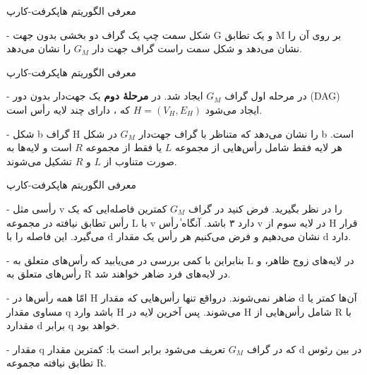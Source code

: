 \begin{itemframe}{‌معرفی الگوریتم هاپکرفت-کارپ}
\item[-]
شکل سمت چپ یک گراف دو بخشی بدون جهت G و یک تطابق M بر روی آن را نشان می‌دهد و شکل سمت راست گراف جهت دار $G_M$ را نشان می‌دهد.
\begin{figure}[h]
  \centering
  \begin{minipage}{0.45\textwidth}
  \end{minipage}
  \hfill
  \begin{minipage}{0.45\textwidth}
  \end{minipage}
\end{figure}

\end{itemframe}


\begin{itemframe}{‌معرفی الگوریتم هاپکرفت-کارپ}
\decLineSpace[-1mm]
\item[-]
در مرحله اول گراف $G_M$ ایجاد شد. در \textbf{مرحلهٔ دوم} یک جهت‌دار بدون دور (DAG) ایجاد می‌شود $H = (V_H, E_H)$ که ، دارای چند لایه‌ رأس است.
\item[-]
شکل b گراف H را نشان می‌دهد که متناظر با گراف جهت‌دار $G_M$ در شکل b است. هر لایه فقط شامل رأس‌هایی از مجموعه $L$ یا فقط از مجموعه $R$ است و لایه‌ها به صورت متناوب از $L$ و $R$ تشکیل می‌شوند.
\end{itemframe}


\begin{itemframe}{‌معرفی الگوریتم هاپکرفت-کارپ}
\item[-]
رأسی مثل v را در نظر بگیرید. فرض کنید در گراف $G_M$ کمترین فاصله‌ایی که یک رأس تطابق نیافته در مجموعه L با v دارد ۳ باشد. آنگاه ٰرأس v در لایه سوم از H‌ قرار می‌‌گیرد. این فاصله را با d نشان می‌دهیم و فرض می‌کنیم هر رأس یک مقدار d دارد.
\item[-]
بنابراین با کمی بررسی در می‌یابید که رأس‌های متعلق به L در لایه‌های زوج ظاهر، و رأس‌های متعلق به R در لایه‌های فرد ضاهر خواهند شد.
\item[-]
امّا همه رأس‌ها در H ضاهر نمی‌شوند. درواقع تنها رأس‌هایی که مقدار d آن‌ها کمتر یا مساوی مقدار q باشد وارد H می‌شوند. پس آخرین لایه در H شامل رأس‌هایی از R با مقدارد d برابر q خواهد بود.
\item[-]
مقدار q که در گراف $G_M$ تعریف می‌شود برابر است با: کمترین مقدار d در بین رئوس تطابق نیافته مجموعه R.

\end{itemframe}


